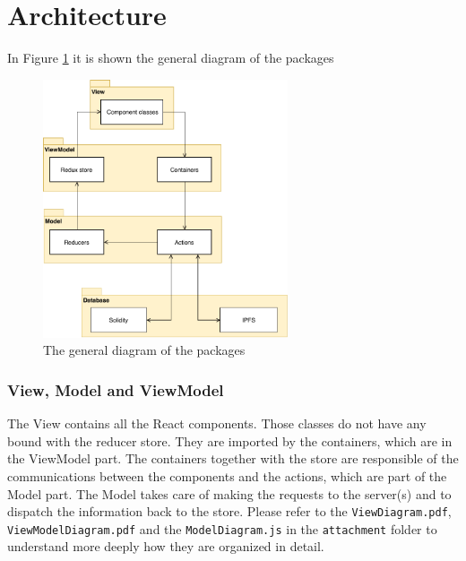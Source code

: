 \section{Architecture}
In Figure \ref{fig:modelDiagram} it is shown the general diagram of the packages 
\begin{figure}[!h]
	\centering
	\includegraphics[height=3in]{img/generalPackageDiagram.pdf}
	\caption{The general diagram of the packages}
	\label{fig:modelDiagram}
\end{figure}
\subsubsection{View, Model and ViewModel}
The View contains all the React components. Those classes do not have any bound with the reducer store. They are imported by the containers, which are in the ViewModel part. The containers together with the store are responsible of the communications between the components and the actions, which are part of the Model part. The Model takes care of making the requests to the server(s) and to dispatch the information back to the store.
Please refer to the \verb|ViewDiagram.pdf|, \verb|ViewModelDiagram.pdf| and the \verb|ModelDiagram.js| in the \verb|attachment| folder to understand more deeply how they are organized in detail.
 